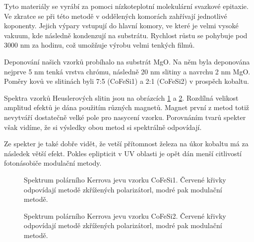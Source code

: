 Tyto materiály se vyrábí za pomoci nízkoteplotní molekulární svazkové epitaxie. Ve zkratce se při této 
metodě v oddělených komorách zahřívají jednotlivé koponenty. Jejich výpary vstupují do hlavní komory, ve které je velmi vysoké vakuum, kde následně kondenzují na substrátu. 
Rychlost růstu se pohybuje pod 3000 nm za hodinu, což umožňuje výrobu velmi tenkých filmů.

Deponování našich vzorků probíhalo na substrát MgO. Na něm byla deponována nejprve 5 nm tenká vrstva chrómu, následně 20 nm slitiny a navrchu 2 nm MgO. Poměry kovů ve slitinách byli 7:5 (CoFeSi1) a 2:1 (CoFeSi2) v prospěch kobaltu.

Spektra vzorků Heuslerových slitin jsou na obrázcích \ref{sCoFeSi1} a \ref{sCoFeSi2}. Rozdílná velikost amplitud efektů je dána použitím různých magnetů. 
Magnet první z metod totiž nevytváří dostatečně velké pole pro nasycení vzorku. Porovnáním tvarů spekter však vidíme, že si výsledky obou metod si spektrálně odpovídají.

Ze spekter je také dobře vidět, že vetší přítomnost železa na úkor kobaltu má za následek větší efekt. Pokles eplipticit v UV oblasti je opět dán menší citlivostí 
fotonásobiče modulační metody.

\begin{figure}

\caption{Spektrum polárního Kerrova jevu vzorku CoFeSi1. Červené křivky odpovídají metodě zkřížených polarizátorl, modré pak modulační metodě.}
\label{sCoFeSi1}
\end{figure}

\begin{figure}

\caption{Spektrum polárního Kerrova jevu vzorku CoFeSi2. Červené křivky odpovídají metodě zkřížených polarizátorl, modré pak modulační metodě.}
\label{sCoFeSi2}
\end{figure}
